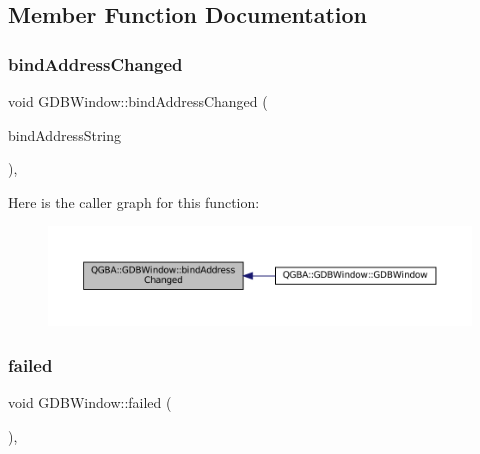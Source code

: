 \subsection{Member Function Documentation}
\mbox{\label{class_q_g_b_a_1_1_g_d_b_window_afc5665a26276b4a468314710bc96bc8c}} 
\subsubsection{\texorpdfstring{bind\+Address\+Changed}{bindAddressChanged}}
{\footnotesize\ttfamily void G\+D\+B\+Window\+::bind\+Address\+Changed (\begin{DoxyParamCaption}\item[{const Q\+String \&}]{bind\+Address\+String }\end{DoxyParamCaption})\hspace{0.3cm}{\ttfamily [private]}, {\ttfamily [slot]}}

Here is the caller graph for this function\+:
\nopagebreak
\begin{figure}[H]
\begin{center}
\leavevmode
\includegraphics[width=350pt]{class_q_g_b_a_1_1_g_d_b_window_afc5665a26276b4a468314710bc96bc8c_icgraph}
\end{center}
\end{figure}
\mbox{\label{class_q_g_b_a_1_1_g_d_b_window_a52e687877be0300b9b131bd99a48932b}} 
\subsubsection{\texorpdfstring{failed}{failed}}
{\footnotesize\ttfamily void G\+D\+B\+Window\+::failed (\begin{DoxyParamCaption}{ }\end{DoxyParamCaption})\hspace{0.3cm}{\ttfamily [private]}, {\ttfamily [slot]}}

